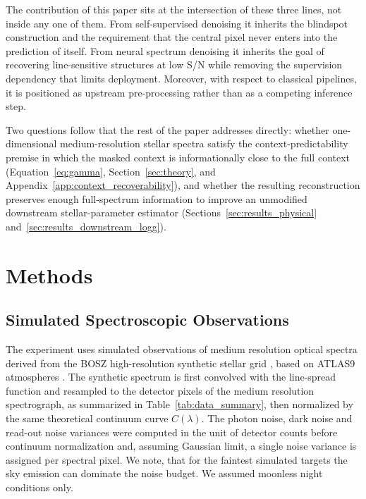 \documentclass[twocolumn]{aastex7}
\begin{document}
The contribution of this paper sits at the intersection of these three lines, not inside any one of them. From self-supervised denoising it inherits the blindspot construction and the requirement that the central pixel never enters into the prediction of itself. From neural spectrum denoising it inherits the goal of recovering line-sensitive structures at low S/N while removing the supervision dependency that limits deployment. Moreover, with respect to classical pipelines, it is positioned as upstream pre-processing rather than as a competing inference step.

Two questions follow that the rest of the paper addresses directly: whether one-dimensional medium-resolution stellar spectra satisfy the context-predictability premise in which the masked context is informationally close to the full context (Equation~\ref{eq:gamma}, Section~\ref{sec:theory}, and Appendix~\ref{app:context_recoverability}), and whether the resulting reconstruction preserves enough full-spectrum information to improve an unmodified downstream stellar-parameter estimator (Sections~\ref{sec:results_physical} and~\ref{sec:results_downstream_logg}).

\section{Methods}
\label{sec:method}

\subsection{Simulated Spectroscopic Observations}
The experiment uses simulated observations of medium resolution optical spectra derived from the BOSZ high-resolution synthetic stellar grid \citep{Bohlin2017,Meszaros2012}, based on ATLAS9 atmospheres \citep{Kurucz1979}. The synthetic spectrum is first convolved with the line-spread function and resampled to the detector pixels of the medium resolution spectrograph, as summarized in Table~\ref{tab:data_summary}, then normalized by the same theoretical continuum curve $C(\lambda)$. The photon noise, dark noise and read-out noise variances were computed in the unit of detector counts before continuum normalization and, assuming Gaussian limit, a single noise variance is assigned per spectral pixel. We note, that for the faintest simulated targets the sky emission can dominate the noise budget. We assumed moonless night conditions only.
\end{document}
